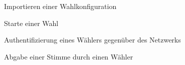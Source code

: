 \documentclass[parskip=full]{scrartcl}
\begin{document}
	\newpage
	\begin{figure}
		\centering
		\hspace{-100pt}
		\centerline{}
		\caption{Importieren einer Wahlkonfiguration}
		\label{fig:config_import}
	\end{figure}

	\newpage
	\begin{figure}
		\centering
		\hspace{-100pt}
		\centerline{}
		\caption{Starte einer Wahl}
		\label{fig:start_election}
	\end{figure}

	\newpage
	\begin{figure}
		\centering
		\hspace{-100pt}
		\centerline{}
		\caption{Authentifizierung eines Wählers gegenüber des Netzwerks}
		\label{fig:voter_auth}
	\end{figure}

	\newpage
	\begin{figure}
		\centering
		\hspace{-100pt}
		\centerline{}
		\caption{Abgabe einer Stimme durch einen Wähler}
		\label{fig:vote_sequence}
	\end{figure}

	\newpage
\end{document}
